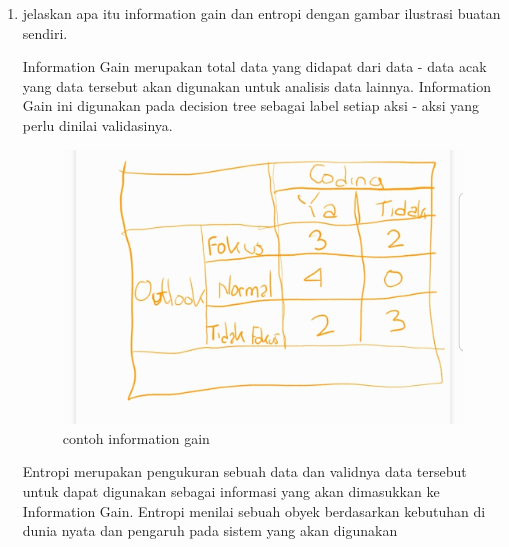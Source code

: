 \begin{enumerate}
\item jelaskan apa itu information gain dan entropi dengan gambar ilustrasi buatan sendiri.\par
Information Gain merupakan total data yang didapat dari data - data acak yang data tersebut akan digunakan untuk analisis data lainnya. Information Gain ini digunakan pada decision tree sebagai label setiap aksi - aksi yang perlu dinilai validasinya. 
\begin{figure}[H]
\centering
\includegraphics[scale=0.2]{figures/1174035/chapter2/info_gain.jpeg}
\caption{contoh information gain}
\label{contoh}
\end{figure}
Entropi merupakan pengukuran sebuah data dan validnya data tersebut untuk dapat digunakan sebagai informasi yang akan dimasukkan ke Information Gain. Entropi menilai sebuah obyek berdasarkan kebutuhan di dunia nyata dan pengaruh pada sistem yang akan digunakan
\begin{figure}[H]
    \centering

\end{figure}
\end{enumerate}
